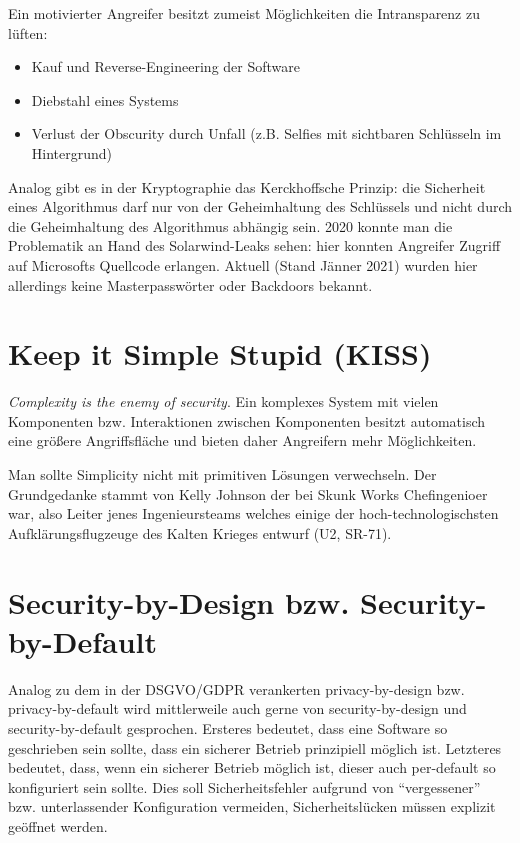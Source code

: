 Ein motivierter Angreifer besitzt zumeist Möglichkeiten die Intransparenz zu lüften:
\begin{itemize}
	\item Kauf und Reverse-Engineering der Software
	\item Diebstahl eines Systems
	\item Verlust der Obscurity durch Unfall (z.B. Selfies mit sichtbaren Schlüsseln im Hintergrund)
\end{itemize}

Analog gibt es in der Kryptographie das Kerckhoffsche Prinzip: die Sicherheit eines Algorithmus darf nur von der Geheimhaltung des Schlüssels und nicht durch die Geheimhaltung des Algorithmus abhängig sein. 2020 konnte man die Problematik an Hand des Solarwind-Leaks sehen: hier konnten Angreifer Zugriff auf Microsofts Quellcode erlangen. Aktuell (Stand Jänner 2021) wurden hier allerdings keine Masterpasswörter oder Backdoors bekannt.

\section{Keep it Simple Stupid (KISS)}

\textit{Complexity is the enemy of security}. Ein komplexes System mit vielen Komponenten bzw. Interaktionen zwischen Komponenten besitzt automatisch eine größere Angriffsfläche und bieten daher Angreifern mehr Möglichkeiten.

Man sollte Simplicity nicht mit primitiven Lösungen verwechseln. Der Grundgedanke stammt von Kelly Johnson der bei Skunk Works Chefingenioer war, also Leiter jenes Ingenieursteams welches einige der hoch-technologischsten Aufklärungsflugzeuge des Kalten Krieges entwurf (U2, SR-71).

\section{Security-by-Design bzw. Security-by-Default}

Analog zu dem in der DSGVO/GDPR verankerten privacy-by-design bzw. privacy-by-default wird mittlerweile auch gerne von security-by-design und security-by-default gesprochen. Ersteres bedeutet, dass eine Software so geschrieben sein sollte, dass ein sicherer Betrieb prinzipiell möglich ist. Letzteres bedeutet, dass, wenn ein sicherer Betrieb möglich ist, dieser auch per-default so konfiguriert sein sollte. Dies soll Sicherheitsfehler aufgrund von ``vergessener'' bzw. unterlassender Konfiguration vermeiden, Sicherheitslücken müssen explizit geöffnet werden.

